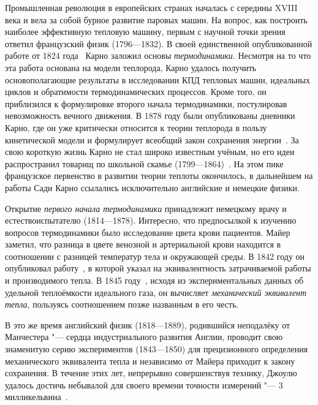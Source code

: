 \documentclass[a4paper, 12pt, oneside]{article} %
\begin{document}
Промышленная революция в европейских странах началась с середины XVIII
века и вела за собой бурное развитие паровых машин. На вопрос, как
построить наиболее эффективную тепловую машину, первым с научной точки
зрения ответил французский физик  (1796---1832). В
своей единственной опубликованной работе от 1824
года~\cite{carnot1923reflections} Карно заложил основы
\emph{термодинамики}. Несмотря на то что эта работа основана на модели
теплорода, Карно удалось получить основополагающие результаты в
исследовании КПД тепловых машин, идеальных циклов и обратимости
термодинамических процессов. Кроме того, он приблизился к формулировке
второго начала термодинамики, постулировав невозможность вечного
движения. В 1878 году были опубликованы дневники Карно, где он уже
критически относится к теории теплорода в пользу кинетической модели и
формулирует всеобщий закон сохранения
энергии~\cite{carnot1923reflections}. За свою короткую жизнь Карно не
стал широко известным учёным, но его идеи распространил товарищ по
школьной скамье 
(1799---1864)~\cite{clapeyron1834memoire}. На этом пике французское
первенство в развитии теории теплоты окончилось, в дальнейшем на работы
Сади Карно ссылались исключительно английские и немецкие физики.

Открытие \emph{первого начала термодинамики} принадлежит немецкому врачу
и естествоиспытателю  (1814---1878). Интересно,
что предпосылкой к изучению вопросов термодинамики было исследование
цвета крови пациентов. Майер заметил, что разница в цвете венозной и
артериальной крови находится в соотношении с разницей температур тела и
окружающей среды. В 1842 году он опубликовал
работу~\cite{mayer1933forces}, в которой указал на эквивалентность
затрачиваемой работы и производимого тепла. В 1845
году~\cite{mayer1933organic}, исходя из экспериментальных данных об
удельной теплоёмкости идеального газа, он вычисляет \emph{механический
эквивалент тепла}, пользуясь соотношением позже названным в его честь.

В это же время английский физик  (1818---1889),
родившийся неподалёку от Манчестера "--- сердца индустриального развития
Англии, проводит свою знаменитую серию экспериментов (1843---1850) для
прецизионного определения механического эквивалента тепла и независимо
от Майера приходит к закону сохранения. В течение этих лет, непрерывно
совершенствуя технику, Джоулю удалось достичь небывалой для своего
времени точности измерений "--- 3 милликельвина~\cite{joule1989equivalent}.
\end{document}
